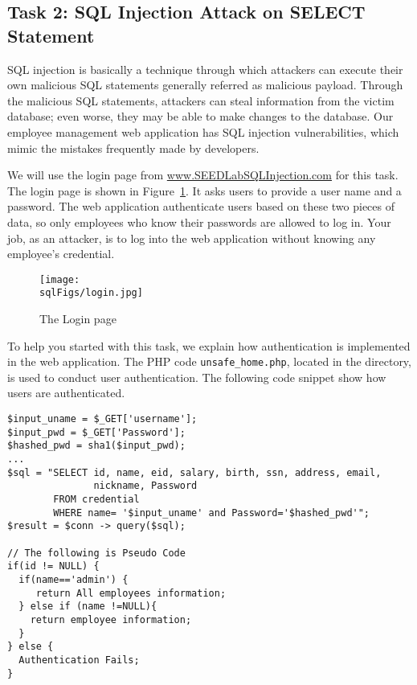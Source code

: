 \subsection{Task 2: SQL Injection Attack on SELECT Statement} 


SQL injection is basically a technique through
which attackers can execute their own malicious SQL statements generally
referred as malicious payload. Through the malicious SQL statements, 
attackers can steal information from the victim database; even worse,
they may be able to make changes to the database. Our employee
management web application has SQL injection vulnerabilities, which mimic 
the mistakes frequently made by developers. 

We will use the login page from \url{www.SEEDLabSQLInjection.com}
for this task. The login page is shown in Figure~\ref{sql:fig:login}. 
It asks users to provide a user name and a password.
The web application authenticate users based on these two pieces 
of data, so only employees who know their 
passwords are allowed to log in.
Your job, as an attacker, is to log into the web application without knowing
any employee's credential. 


\begin{figure}[htb]
\begin{center}
\texttt{[image: \\sqlFigs/login.jpg]}
\end{center}
\caption{The Login page}
\label{sql:fig:login}
\end{figure}
 

To help you started with this task, we explain how authentication
is implemented in the web application. The PHP code 
\texttt{unsafe\_home.php}, located in the  directory, 
is used to conduct user authentication.
The following code snippet show how users are authenticated. 

\begin{lstlisting}
$input_uname = $_GET['username'];
$input_pwd = $_GET['Password'];
$hashed_pwd = sha1($input_pwd);
...
$sql = "SELECT id, name, eid, salary, birth, ssn, address, email, 
               nickname, Password
        FROM credential
        WHERE name= '$input_uname' and Password='$hashed_pwd'";
$result = $conn -> query($sql);

// The following is Pseudo Code 
if(id != NULL) {
  if(name=='admin') {
     return All employees information;
  } else if (name !=NULL){
    return employee information;
  }
} else {
  Authentication Fails;
}
\end{lstlisting}

